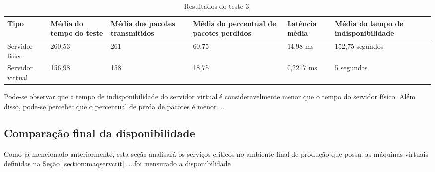 \begin{table}[h!]
\caption{Resultados do teste 3.}
\label{tab:teste3resultados}
\begin{center}
\begin{tabular}{|l|p{2.5cm}|p{2.5cm}|p{2.5cm}|p{2.5cm}|p{3cm}|}\hline
\textbf{Tipo} & \textbf{Média do tempo do teste} & \textbf{Média dos pacotes transmitidos} & \textbf{Média do percentual de pacotes perdidos} & \textbf{Latência média} & \textbf{Média do tempo de indisponibilidade} \\\hline
Servidor físico & 260,53 & 261 & 60,75 & 14,98 ms & 152,75 segundos \\\hline
Servidor virtual & 156,98 & 158 & 18,75 & 0,2217 ms & 5 segundos \\\hline
\end{tabular}
\end{center}
\end{table}

Pode-se observar que o tempo de indisponibilidade do servidor virtual é consideravelmente menor que o tempo do servidor físico.
Além disso, pode-se perceber que o percentual de perda de pacotes é menor.
...

\subsection{Comparação final da disponibilidade}
\label{section:comparacaofinal}

Como já mencionado anteriormente, esta seção analisará os serviços críticos no ambiente final de produção que possui as máquinas virtuais
definidas na Seção \ref{section:maqservcrit}. 
...foi mensurado a disponibilidade


